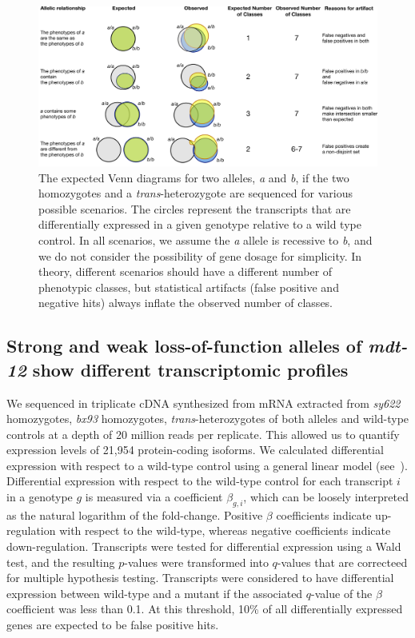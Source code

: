 \documentclass[10pt, twocolumn]{article}
\newcommand{\gene}[1]{\mbox{\emph{#1}}}
\begin{document}
\begin{figure}
  \includegraphics[width=\textwidth]{../figs/AllelicAnalysis_With_Het}
  \caption{
  The expected Venn diagrams for two alleles, \emph{a} and
  \emph{b}, if the two homozygotes and a \emph{trans}-heterozygote are
  sequenced for various possible scenarios. The circles represent the transcripts
  that are differentially expressed in a given genotype relative to a wild type
  control. In all scenarios, we assume the
  \emph{a} allele is recessive to \emph{b}, and we do not consider the
  possibility of gene dosage for simplicity. In theory, different scenarios
  should have a different number of phenotypic classes, but statistical artifacts
  (false positive and negative hits) always inflate the observed number of
  classes.
  }
\label{fig:framework}
\end{figure}


\subsection*{Strong and weak loss-of-function alleles of \gene{mdt-12} show
             different transcriptomic profiles}
We sequenced in triplicate cDNA synthesized from mRNA extracted from
\emph{sy622} homozygotes, \emph{bx93} homozygotes,
\emph{trans}-heterozygotes of both alleles and wild-type controls at a depth of
20 million reads per replicate. This allowed us to quantify expression levels of
21,954 protein-coding isoforms. We calculated differential expression with
respect to a wild-type control using a general linear model
(see~). Differential expression with respect to the
wild-type control for each transcript $i$ in a genotype $g$ is measured via a
coefficient $\beta_{g, i}$, which can be loosely interpreted as the natural
logarithm of the fold-change. Positive $\beta$ coefficients indicate
up-regulation with respect to the wild-type, whereas negative coefficients
indicate down-regulation. Transcripts were tested for differential expression
using a Wald test, and the resulting $p$-values were transformed into $q$-values
that are correcteed for multiple hypothesis testing. Transcripts were considered
to have differential expression between wild-type and a mutant if the associated
$q$-value of the $\beta$ coefficient was less than 0.1. At this threshold, 10\%
of all differentially expressed genes are expected to be false positive hits.
\end{document}
